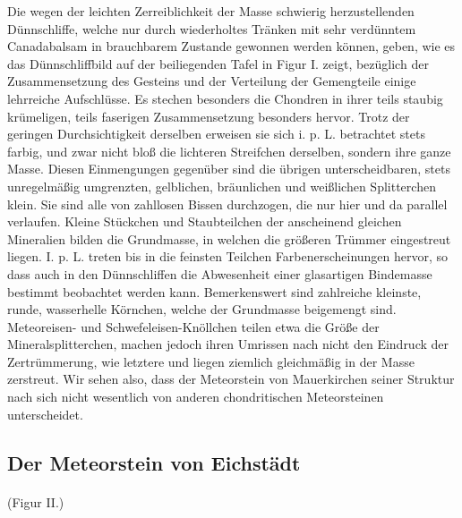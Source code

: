 \documentclass[a4paper, 11pt, oneside]{article}
\begin{document}
Die wegen der leichten Zerreiblichkeit der Masse schwierig herzustellenden Dünnschliffe, welche nur durch wiederholtes Tränken mit sehr verdünntem Canadabalsam in brauchbarem Zustande gewonnen werden können, geben, wie es das Dünnschliffbild auf der beiliegenden Tafel in Figur I. zeigt, bezüglich der Zusammensetzung des Gesteins und der Verteilung der Gemengteile einige lehrreiche Aufschlüsse. Es stechen besonders die Chondren in ihrer teils staubig krümeligen, teils faserigen Zusammensetzung besonders hervor. Trotz der geringen Durchsichtigkeit derselben erweisen sie sich i. p. L. betrachtet stets farbig, und zwar nicht bloß die lichteren Streifchen derselben, sondern ihre ganze Masse. Diesen Einmengungen gegenüber sind die übrigen unterscheidbaren, stets unregelmäßig umgrenzten, gelblichen, bräunlichen und weißlichen Splitterchen klein. Sie sind alle von zahllosen Bissen durchzogen, die nur hier und da parallel verlaufen. Kleine Stückchen und Staubteilchen der anscheinend gleichen Mineralien bilden die Grundmasse, in welchen die größeren Trümmer eingestreut liegen. I. p. L. treten bis in die feinsten Teilchen Farbenerscheinungen hervor, so dass auch in den Dünnschliffen die Abwesenheit einer glasartigen Bindemasse bestimmt beobachtet werden kann. Bemerkenswert sind zahlreiche kleinste, runde, wasserhelle Körnchen, welche der Grundmasse beigemengt sind. Meteoreisen- und Schwefeleisen-Knöllchen teilen etwa die Größe der Mineralsplitterchen, machen jedoch ihren Umrissen nach nicht den Eindruck der Zertrümmerung, wie letztere und liegen ziemlich gleichmäßig in der Masse zerstreut. Wir sehen also, dass der Meteorstein von Mauerkirchen seiner Struktur nach sich nicht wesentlich von anderen chondritischen Meteorsteinen unterscheidet.
\clearpage
\subsection{Der Meteorstein von Eichstädt}
\paragraph{}
(Figur II.)
\end{document}
